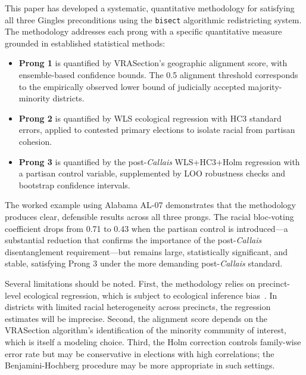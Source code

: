 \label{sec:conclusion}

This paper has developed a systematic, quantitative methodology for satisfying
all three Gingles preconditions using the \texttt{bisect} algorithmic
redistricting system.  The methodology addresses each prong with a specific
quantitative measure grounded in established statistical methods:

\begin{itemize}
  \item \textbf{Prong 1} is quantified by VRASection's geographic alignment
    score, with ensemble-based confidence bounds.  The 0.5 alignment threshold
    corresponds to the empirically observed lower bound of judicially accepted
    majority-minority districts.

  \item \textbf{Prong 2} is quantified by WLS ecological regression with HC3
    standard errors, applied to contested primary elections to isolate racial
    from partisan cohesion.

  \item \textbf{Prong 3} is quantified by the post-\textit{Callais}
    WLS+HC3+Holm regression with a partisan control variable, supplemented by
    LOO robustness checks and bootstrap confidence intervals.
\end{itemize}

The worked example using Alabama AL-07 demonstrates that the methodology
produces clear, defensible results across all three prongs.  The racial
bloc-voting coefficient drops from 0.71 to 0.43 when the partisan control
is introduced---a substantial reduction that confirms the importance of the
post-\textit{Callais} disentanglement requirement---but remains large,
statistically significant, and stable, satisfying Prong 3 under the more
demanding post-\textit{Callais} standard.

Several limitations should be noted.  First, the methodology relies on
precinct-level ecological regression, which is subject to ecological inference
bias~\citep{king1997solution}.  In districts with limited racial heterogeneity
across precincts, the regression estimates will be imprecise.  Second, the
alignment score depends on the VRASection algorithm's identification of the
minority community of interest, which is itself a modeling choice.  Third, the
Holm correction controls family-wise error rate but may be conservative in
elections with high correlations; the Benjamini-Hochberg procedure may be
more appropriate in such settings.

